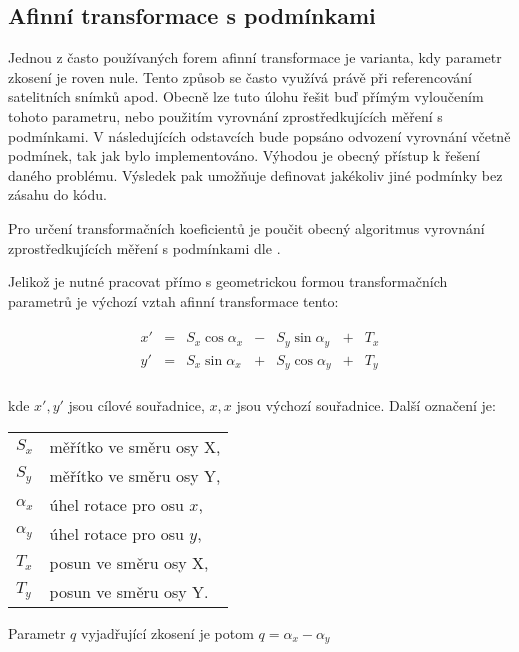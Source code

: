 \subsection{Afinní transformace s podmínkami}

Jednou z často používaných forem afinní transformace je varianta, kdy
parametr zkosení je roven nule. Tento způsob se často využívá právě při
referencování satelitních snímků apod. Obecně lze tuto úlohu řešit buď přímým
vyloučením tohoto parametru, nebo použitím vyrovnání zprostředkujících měření
s podmínkami. V následujících odstavcích bude popsáno odvození vyrovnání
včetně podmínek, tak jak bylo implementováno. Výhodou je obecný přístup k
řešení daného problému. Výsledek pak umožňuje definovat jakékoliv jiné podmínky
bez zásahu do kódu.

Pro určení transformačních koeficientů je poučit  obecný algoritmus vyrovnání
zprostředkujících měření s podmínkami dle \cite{vyrovnani}.

Jelikož je nutné pracovat přímo s geometrickou formou transformačních parametrů
je výchozí vztah afinní transformace tento:

\begin{eqnarray}
\begin{array}{ccccccc}
\label{afinni}
x'&=&  S_{x} \cos{\alpha_{x}}& -&S_{y} \sin{\alpha_{y}} &+& T_{x}\\
y'&=&  S_{x} \sin{\alpha_{x}}& +&S_{y} \cos{\alpha_{y}} &+& T_{y}\\
\end{array}
\end{eqnarray}

kde $x', y'$ jsou cílové souřadnice, $x, x$ jsou výchozí souřadnice. Další
označení je:

\begin{table}[h]
\centering

\begin{tabular}{ll}
$S_{x}$  & měřítko ve směru osy X, \\
$S_{y}$  & měřítko ve směru osy Y, \\
$\alpha_{x}$ & úhel rotace pro osu $x$, \\
$\alpha_{y}$ & úhel rotace pro osu $y$, \\
$T_{x}$  & posun ve směru osy X, \\
$T_{y}$  & posun ve směru osy Y. \\
\end{tabular}
\end{table}
Parametr $q$ vyjadřující zkosení je potom $q = \alpha_{x} - \alpha_{y}$

